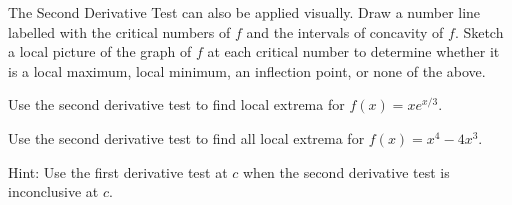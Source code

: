 \documentclass[../main.tex]{subfiles}
\begin{document}
\faStar{} The Second Derivative Test can also be applied visually. Draw a number line labelled with the critical numbers of \(f\) and the intervals of concavity of \(f\). Sketch a local picture of the graph of \(f\) at each critical number to determine whether it is a local maximum, local minimum, an inflection point, or none of the above.

\begin{example}
  Use the second derivative test to find local extrema for \(f(x) = x e^{x/3}\).

  \blanks*
\end{example}
\clearpage

\begin{exercise}
  Use the second derivative test to find all local extrema for \(f(x) = x^{4} - 4x^{3}\).

  {\footnotesize Hint: Use the first derivative test at \(c\) when the second derivative test is inconclusive at \(c\).}

\end{exercise}
\clearpage
\end{document}
